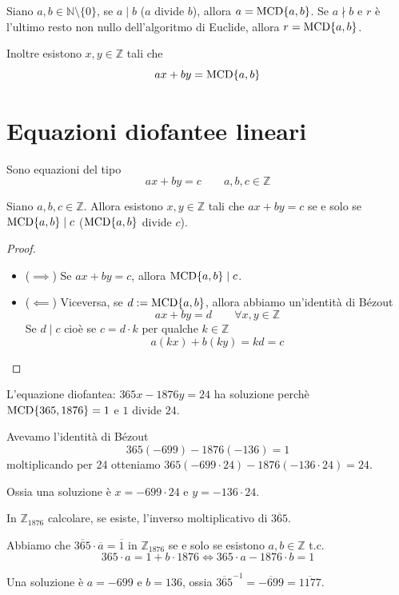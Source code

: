 \documentclass[../main.tex]{subfiles}
\begin{document}
\begin{theorem}
    Siano $a,b \in \mathbb{N} \setminus \{0\}$, se $a \mid b$ ($a$ divide $b$), allora $a = \operatorname{MCD}\{a,b\}$. Se $a \nmid b$ e $r$ è l'ultimo resto non nullo dell'algoritmo di Euclide, allora $r = \operatorname{MCD} \{a,b\}$.

    Inoltre esistono $x,y \in \mathbb{Z} $ tali che
    \[
        ax + by = \operatorname{MCD} \{a,b\}
    \]
\end{theorem}

\section{Equazioni diofantee lineari}
Sono equazioni del tipo
\[
    \boxed{
        ax + by = c \qquad a,b,c \in \mathbb{Z}
    }
\]
\begin{proposition}
    Siano $a,b,c \in \mathbb{Z} $. Allora esistono $x,y \in \mathbb{Z} $ tali che $ax + by = c$ se e solo se $\operatorname{MCD} \{a,b\} \mid c$ ($\operatorname{MCD} \{a,b\}$ divide $c$).
\end{proposition}

\begin{proof}\
    \begin{itemize}
        \item ($\implies$) Se $ax + by = c$, allora $\operatorname{MCD} \{a,b\} \mid c$.
        \item ($\impliedby$) Viceversa, se $d := \operatorname{MCD} \{a,b\}$, allora abbiamo un'identità di Bézout
              \[
                  ax + by = d \qquad \forall x,y \in \mathbb{Z}
              \]
              Se $d \mid c$ cioè se $c = d \cdot k$ per qualche $k \in \mathbb{Z} $
              \[
                  a(kx) + b(ky) = kd = c
              \]
    \end{itemize}
\end{proof}

\begin{example}
    L'equazione diofantea: $365x - 1876y = 24$ ha soluzione perchè $\operatorname{MCD} \{365,1876\} = 1$ e $1$ divide $24$.

    Avevamo l'identità di Bézout
    \[
        365(-699) - 1876(-136) = 1
    \]
    moltiplicando per 24 otteniamo $365(-699 \cdot 24) - 1876(-136 \cdot 24) = 24$.

    Ossia una soluzione è $x = -699 \cdot 24$ e $y = -136 \cdot 24$.
\end{example}

\begin{example}
    In $\mathbb{Z}_{1876}$ calcolare, se esiste, l'inverso moltiplicativo di $\overline{365}$.

    Abbiamo che $\overline{365} \cdot \overline{a} = \overline{1}$ in $\mathbb{Z}_{1876}$ se e solo se esistono $a,b \in \mathbb{Z}$ t.c.
    \[
        365 \cdot a = 1 + b \cdot 1876 \iff 365 \cdot a - 1876 \cdot b = 1
    \]

    Una soluzione è $a = -699$ e $b = 136$, ossia $\overline{365}^{-1} = \overline{-699} = \overline{1177}$.
\end{example}
\end{document}
